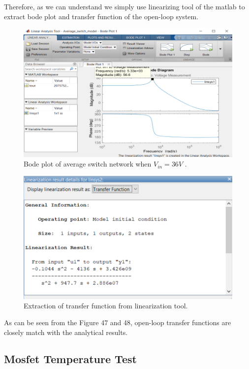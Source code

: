 \documentclass{article}
\begin{document}
	Therefore, as we can understand we simply use linearizing tool of the matlab to extract bode plot and transfer function of the open-loop system.
\begin{figure}[H]
    \centering
    \includegraphics[scale=0.8]{s2.png}
    \caption{Bode plot of average switch network when $V_{in}=36V$ .}
    \label{fig:my_label}
\end{figure}
\begin{figure}[H]
    \centering
    \includegraphics[scale=0.8]{s3.png}
    \caption{Extraction of transfer function from linearization tool.}
    \label{fig:my_label}
\end{figure}



As can be seen from the Figure 47 and 48, open-loop transfer functions are closely match with the analytical results.

\subsection{Mosfet Temperature Test}
\end{document}
